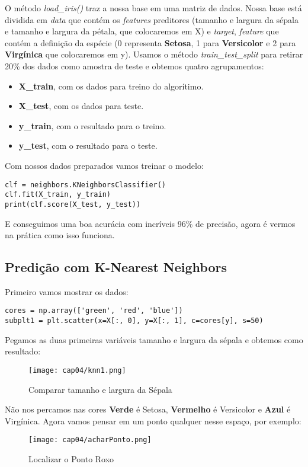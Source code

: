 O método \textit{load\_iris()} traz a nossa base em uma matriz de dados. Nossa base está dividida em \textit{data} que contém os \textit{features} preditores (tamanho e largura da sépala e tamanho e largura da pétala, que colocaremos em X) e \textit{target}, \textit{feature} que contém a definição da espécie (0 representa \textbf{Setosa}, 1 para \textbf{Versicolor} e 2 para \textbf{Virgínica} que colocaremos em y). Usamos o método \textit{train\_test\_split} para retirar 20\% dos dados como amostra de teste e obtemos quatro agrupamentos:
\begin{itemize}[nolistsep]
	\item \textbf{X\_train}, com os dados para treino do algorítimo.
	\item \textbf{X\_test}, com os dados para teste.
	\item \textbf{y\_train}, com o resultado para o treino.
	\item \textbf{y\_test}, com o resultado para o teste.
\end{itemize}

Com nossos dados preparados vamos treinar o modelo:
\begin{lstlisting}[]
clf = neighbors.KNeighborsClassifier()
clf.fit(X_train, y_train)
print(clf.score(X_test, y_test))
\end{lstlisting}

E conseguimos uma boa acurácia com incríveis 96\% de precisão, agora é vermos na prática como isso funciona. 

\subsection{Predição com K-Nearest Neighbors}
Primeiro vamos mostrar os dados:
\begin{lstlisting}[]
cores = np.array(['green', 'red', 'blue'])
subplt1 = plt.scatter(x=X[:, 0], y=X[:, 1], c=cores[y], s=50)
\end{lstlisting}

Pegamos as duas primeiras variáveis tamanho e largura da sépala e obtemos como resultado:
\begin{figure}[H]
	\centering
	\texttt{[image: cap04/knn1.png]}
	\caption{Comparar tamanho e largura da Sépala}
\end{figure}

Não nos percamos nas cores \textbf{Verde} é Setosa, \textbf{Vermelho} é Versicolor e \textbf{Azul} é Virgínica. Agora vamos pensar em um ponto qualquer nesse espaço, por exemplo:
\begin{figure}[H]
	\centering
	\texttt{[image: cap04/acharPonto.png]}
	\caption{Localizar o Ponto Roxo}
\end{figure}

